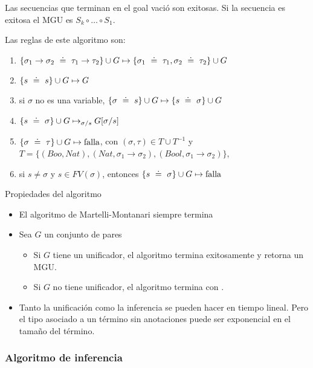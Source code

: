 Las secuencias que terminan en el goal vació son exitosas. Si la secuencia es exitosa el MGU es $S_k \circ \dots \circ S_1$.

Las reglas de este algoritmo son:

\begin{enumerate}
  \item {} $\{\sigma_1\to\sigma_2 \uni \tau_1\to\tau_2\} \cup G \unito \{\sigma_1 \uni \tau_1, \sigma_2 \uni \tau_2\} \cup G$
  \item {} $\{s \uni s\} \cup G \unito G$
  \item {} si $\sigma$ no es una variable, $\{\sigma \uni s\} \cup G \unito \{s \uni \sigma\} \cup G$
  \item {} $\{s \uni \sigma\} \cup G \unito_{\sigma/s} G[\sigma/s]$
  \item {} $\{\sigma \uni \tau\} \cup G \unito \text{falla}$, con $(\sigma, \tau) \in T \cup T^{-1}$ y $T = \{(Boo, Nat), (Nat, \sigma_1 \to \sigma_2), (Bool, \sigma_1 \to \sigma_2)\}$,
  \item {} si $s \neq \sigma$ y $s \in FV(\sigma)$, entonces $\{s \uni \sigma\} \cup G \unito \text{falla}$
\end{enumerate}

\begin{teo}
  Propiedades del algoritmo
  \begin{itemize}
    \item El algoritmo de Martelli-Montanari siempre termina
    \item Sea $G$ un conjunto de pares
      \begin{itemize}
        \item Si $G$ tiene un unificador, el algoritmo termina exitosamente y retorna un MGU.
        \item Si $G$ no tiene unificador, el algoritmo termina con .
      \end{itemize}
    \item Tanto la unificación como la inferencia se pueden hacer en tiempo lineal. Pero el tipo asociado a un término sin anotaciones puede ser exponencial en el tamaño del término.
  \end{itemize}
\end{teo}

\subsubsection{Algoritmo de inferencia}

